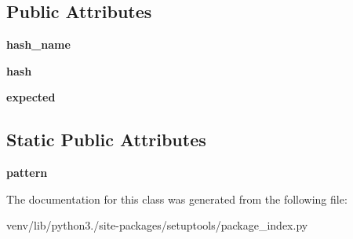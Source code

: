\subsection*{Public Attributes}
\begin{DoxyCompactItemize}
\item 
\mbox{\label{classsetuptools_1_1package__index_1_1_hash_checker_a42deccfa15fe220e91ebe932790577a3}} 
{\bfseries hash\+\_\+name}
\item 
\mbox{\label{classsetuptools_1_1package__index_1_1_hash_checker_a591f6506d010b8452ac48ddb469bb5a7}} 
{\bfseries hash}
\item 
\mbox{\label{classsetuptools_1_1package__index_1_1_hash_checker_ae1723599c7c9ce64760276a0325f58dc}} 
{\bfseries expected}
\end{DoxyCompactItemize}
\subsection*{Static Public Attributes}
\begin{DoxyCompactItemize}
\item 
\mbox{\label{classsetuptools_1_1package__index_1_1_hash_checker_addd5cbb7153e31acac4e78f5dcb292d9}} 
{\bfseries pattern}
\end{DoxyCompactItemize}


The documentation for this class was generated from the following file\+:\begin{DoxyCompactItemize}
\item 
venv/lib/python3./site-\/packages/setuptools/package\+\_\+index.\+py\end{DoxyCompactItemize}
